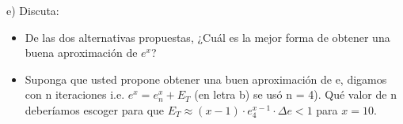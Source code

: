 \documentclass[]{article}
\begin{document}
e) Discuta:

\begin{itemize}
	\item De las dos alternativas propuestas, ¿Cuál es la mejor forma de obtener una buena aproximación de $e^{x}$?

	\item Suponga que usted propone obtener una buen aproximación de e, digamos con n iteraciones i.e. $e^{x} = e_{n}^{x} + E_{T}$ (en letra b) se usó n = 4). Qué valor de n deberíamos escoger para que $E_{T} \approx (x-1) \cdot e_{4}^{x-1} \cdot \Delta e < 1$ para $x = 10$. \\
	
\end{itemize}


\section{}
\end{document}
